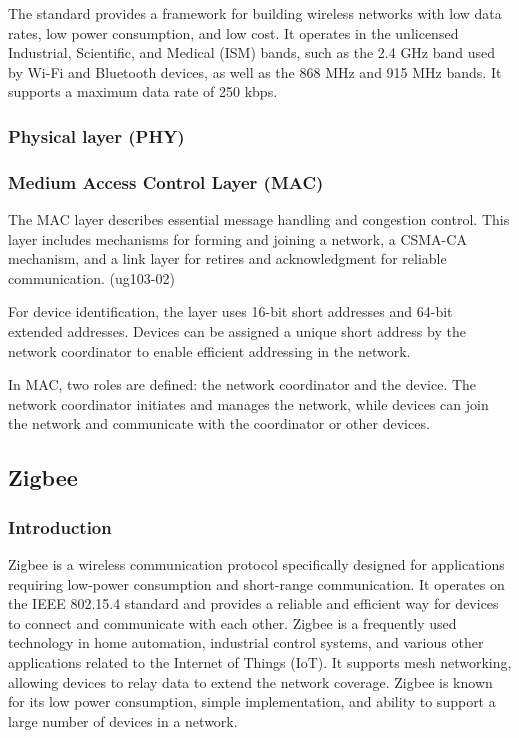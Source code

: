 The standard provides a framework for building wireless networks with low data rates, low power consumption, and low cost.
It operates in the unlicensed Industrial, Scientific, and Medical (ISM) bands, such as the 2.4 GHz band used by Wi-Fi
and Bluetooth devices, as well as the 868 MHz and 915 MHz bands.
It supports a maximum data rate of 250 kbps.

\subsubsection{Physical layer (PHY)}

\subsubsection{Medium Access Control Layer (MAC)}
The MAC layer describes essential message handling and congestion control.
This layer includes mechanisms for forming and joining a network, a CSMA-CA mechanism,
and a link layer for retires and acknowledgment for reliable communication. (ug103-02)

For device identification, the layer uses 16-bit short addresses and 64-bit extended addresses.
Devices can be assigned a unique short address by the network coordinator to enable efficient addressing in the network.

In MAC, two roles are defined: the network coordinator and the device.
The network coordinator initiates and manages the network, while devices can join the network
and communicate with the coordinator or other devices.


\subsection{Zigbee}
\label{sec:zig}

\subsubsection{Introduction}
\label{zb:into}
Zigbee is a wireless communication protocol specifically designed for
applications requiring low-power consumption and short-range communication.
It operates on the IEEE 802.15.4 standard and provides a reliable and efficient way
for devices to connect and communicate with each other.
Zigbee is a frequently used technology in home automation, industrial control systems,
and various other applications related to the Internet of Things (IoT).
It supports mesh networking, allowing devices to relay data to extend the network
coverage. Zigbee is known for its low power consumption, simple implementation, and
ability to support a large number of devices in a network.

